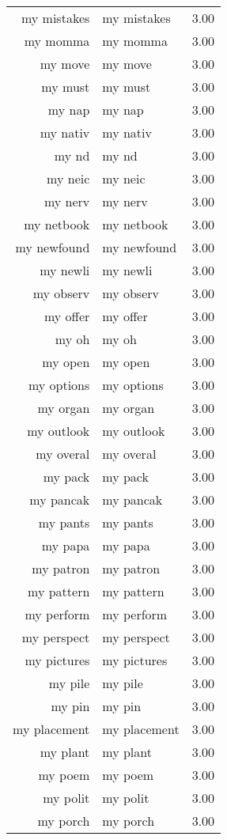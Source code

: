 \begin{table}[ht]
\begin{tabular}{rlr}
  my mistakes & my mistakes & 3.00 \\ 
  my momma & my momma & 3.00 \\ 
  my move & my move & 3.00 \\ 
  my must & my must & 3.00 \\ 
  my nap & my nap & 3.00 \\ 
  my nativ & my nativ & 3.00 \\ 
  my nd & my nd & 3.00 \\ 
  my neic & my neic & 3.00 \\ 
  my nerv & my nerv & 3.00 \\ 
  my netbook & my netbook & 3.00 \\ 
  my newfound & my newfound & 3.00 \\ 
  my newli & my newli & 3.00 \\ 
  my observ & my observ & 3.00 \\ 
  my offer & my offer & 3.00 \\ 
  my oh & my oh & 3.00 \\ 
  my open & my open & 3.00 \\ 
  my options & my options & 3.00 \\ 
  my organ & my organ & 3.00 \\ 
  my outlook & my outlook & 3.00 \\ 
  my overal & my overal & 3.00 \\ 
  my pack & my pack & 3.00 \\ 
  my pancak & my pancak & 3.00 \\ 
  my pants & my pants & 3.00 \\ 
  my papa & my papa & 3.00 \\ 
  my patron & my patron & 3.00 \\ 
  my pattern & my pattern & 3.00 \\ 
  my perform & my perform & 3.00 \\ 
  my perspect & my perspect & 3.00 \\ 
  my pictures & my pictures & 3.00 \\ 
  my pile & my pile & 3.00 \\ 
  my pin & my pin & 3.00 \\ 
  my placement & my placement & 3.00 \\ 
  my plant & my plant & 3.00 \\ 
  my poem & my poem & 3.00 \\ 
  my polit & my polit & 3.00 \\ 
  my porch & my porch & 3.00 \\ 

\end{tabular}
\end{table}
